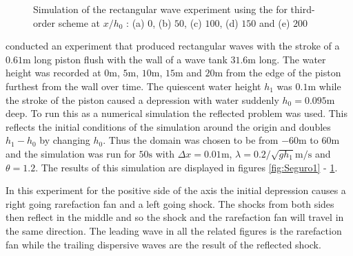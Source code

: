 \documentclass[SingleSpace,12pt]{Serre_ASCE}
\begin{document}
\begin{figure}[htb]
\caption{Simulation of the rectangular wave experiment using the for third-order scheme at $x/h_0$ : (a) $0$, (b) $50$, (c) $100$, (d) $150$ and (e) $200$}
\label{fig:Seguro3}
\end{figure}
 conducted an experiment that produced rectangular waves with the stroke of a $0.61\text{m}$ long piston flush with the wall of a wave tank $31.6\text{m}$ long. The water height was recorded at $0\text{m}$, $5\text{m}$, $10\text{m}$, $15\text{m}$ and $20\text{m}$ from the edge of the piston furthest from the wall over time. The quiescent water height $h_1$ was $0.1\text{m}$ while the stroke of the piston caused a depression with water suddenly $h_0 = 0.095\text{m}$ deep. To run this as a numerical simulation the reflected problem was used. This reflects the initial conditions of the simulation around the origin and doubles $h_1 - h_0$ by changing $h_0$. Thus the domain was chosen to be from $-60\text{m}$ to $60\text{m}$ and the simulation was run for $50\text{s}$ with $\Delta x = 0.01 \text{m}$, $\lambda = 0.2/\sqrt{g h_1} \text{m/s}$ and $\theta = 1.2$. The results of this simulation are displayed in figures \ref{fig:Seguro1} - \ref{fig:Seguro3}.

In this experiment for the positive side of the axis the initial depression causes a right going rarefaction fan and a left going shock. The shocks from both sides then reflect in the middle and so the shock and the rarefaction fan will travel in the same direction. The leading wave in all the related figures is the rarefaction fan while the trailing dispersive waves are the result of the reflected shock.  
\end{document}
